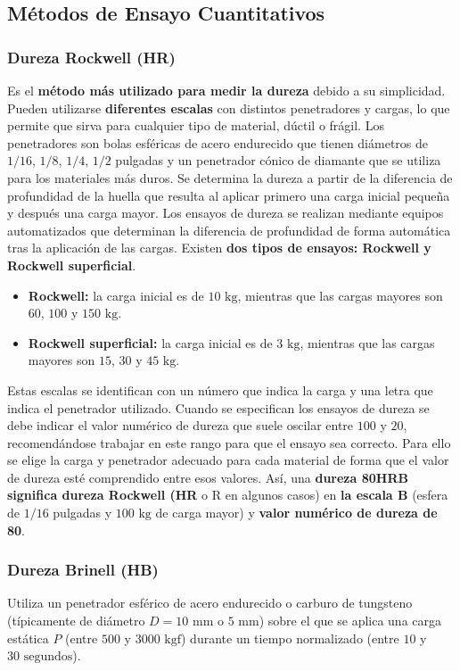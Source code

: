 \subsection{Métodos de Ensayo Cuantitativos}

\subsubsection{Dureza Rockwell (HR)}
Es el \textbf{método más utilizado para medir la dureza} debido a su simplicidad. Pueden utilizarse \textbf{diferentes escalas} con distintos penetradores y cargas, lo que permite que sirva para cualquier tipo de material, dúctil o frágil. Los penetradores son bolas esféricas de acero endurecido que tienen diámetros de $1/16$, $1/8$, $1/4$, $1/2$ pulgadas y un penetrador cónico de diamante que se utiliza para los materiales más duros. Se determina la dureza a partir de la diferencia de profundidad de la huella que resulta al aplicar primero una carga inicial pequeña y después una carga mayor. Los ensayos de dureza se realizan mediante equipos automatizados que determinan la diferencia de profundidad de forma automática tras la aplicación de las cargas. Existen \textbf{dos tipos de ensayos: Rockwell y Rockwell superficial}.
\begin{itemize}
    \item \textbf{Rockwell:} la carga inicial es de $10\text{ kg}$, mientras que las cargas mayores son $60$, $100$ y $150\text{ kg}$.
    \item \textbf{Rockwell superficial:} la carga inicial es de $3\text{ kg}$, mientras que las cargas mayores son $15$, $30$ y $45\text{ kg}$.
\end{itemize}
Estas escalas se identifican con un número que indica la carga y una letra que indica el penetrador utilizado. Cuando se especifican los ensayos de dureza se debe indicar el valor numérico de dureza que suele oscilar entre $100$ y $20$, recomendándose trabajar en este rango para que el ensayo sea correcto. Para ello se elige la carga y penetrador adecuado para cada material de forma que el valor de dureza esté comprendido entre esos valores. Así, una \textbf{dureza 80HRB significa dureza Rockwell (HR} o R en algunos casos) en \textbf{la escala B} (esfera de $1/16$ pulgadas y $100\text{ kg}$ de carga mayor) y \textbf{valor numérico de dureza de 80}.

\subsubsection{Dureza Brinell (HB)}
Utiliza un penetrador esférico de acero endurecido o carburo de tungsteno (típicamente de diámetro $D = 10\text{ mm}$ o $5\text{ mm}$) sobre el que se aplica una carga estática $P$ (entre $500$ y $3000\text{ kgf}$) durante un tiempo normalizado (entre $10$ y $30\text{ segundos}$).

